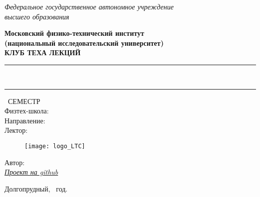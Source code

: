 \begin{titlepage}
	\clearpage\thispagestyle{empty}
	\centering
	
	\textit{Федеральное государственное автономное учреждение \\
		высшего образования}
	\vspace{0.5ex}
	
	\textbf{Московский физико-технический институт
    \\
    (национальный исследовательский университет)
    \\
     КЛУБ ТЕХА ЛЕКЦИЙ}
	\vspace{20ex}
	
	\rule{\linewidth}{0.5mm}
	{\textbf{\FullCourseNameFirstPart}}
	\\
	{\textbf{\FullCourseNameSecondPart}}
	\rule{\linewidth}{0.5mm}
	
	\SemesterNumber\ СЕМЕСТР
	\\
	Физтех-школа: \textit{\SchoolName}
	\\
	Направление: \textit{\TrackName}
	\\
	Лектор: \textit{\LecturerInitials}
	\vspace{1ex}
	
	\begin{figure}[!ht]
		\centering
		\texttt{[image: logo\_LTC]}
		\label{fig:my_label}
	\end{figure}
\begin{flushright}
	\noindent
	Автор: \href{\VKLink}{\textit{\AutherInitials}}
	\\
	\href{\GithubLink}{\textit{Проект на github}} 
\end{flushright}
	
	\vfill
	Долгопрудный, \CourseDate\ год.
	\pagebreak
	
\end{titlepage}
